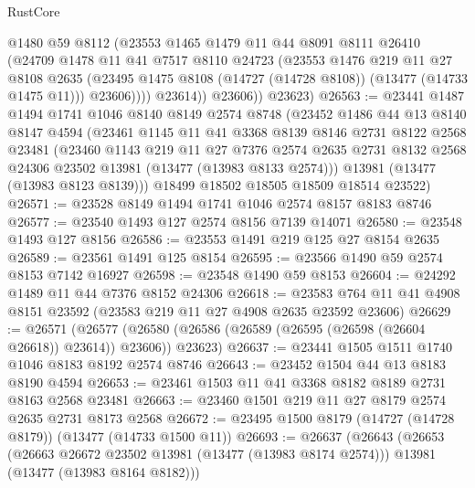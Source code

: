 \begin{lexlean}{RustCore}
\begin{coremodule}
                @1480
                @59
                @8112
                (@23553
                  @1465
                  @1479
                  @11
                  @44
                  @8091
                  @8111
                  @26410
                  (@24709
                    @1478
                    @11
                    @41
                    @7517
                    @8110
                    @24723
                    (@23553
                      @1476
                      @219
                      @11
                      @27
                      @8108
                      @2635
                      (@23495 @1475 @8108 (@14727 (@14728 @8108)) (@13477 (@14733 @1475 @11)))
                      @23606))))
              @23614))
          @23606))
      @23623)
@26563 := @23441
    @1487
    @1494
    @1741
    @1046
    @8140
    @8149
    @2574
    @8748
    (@23452
      @1486
      @44
      @13
      @8140
      @8147
      @4594
      (@23461
        @1145
        @11
        @41
        @3368
        @8139
        @8146
        @2731
        @8122
        @2568
        @23481
        (@23460
          @1143
          @219
          @11
          @27
          @7376
          @2574
          @2635
          @2731
          @8132
          @2568
          @24306
          @23502
          @13981
          (@13477 (@13983 @8133 @2574)))
        @13981
        (@13477 (@13983 @8123 @8139)))
      @18499
      @18502
      @18505
      @18509
      @18514
      @23522)
@26571 := @23528 @8149 @1494 @1741 @1046 @2574 @8157 @8183 @8746
@26577 := @23540 @1493 @127 @2574 @8156 @7139 @14071
@26580 := @23548 @1493 @127 @8156
@26586 := @23553 @1491 @219 @125 @27 @8154 @2635
@26589 := @23561 @1491 @125 @8154
@26595 := @23566 @1490 @59 @2574 @8153 @7142 @16927
@26598 := @23548 @1490 @59 @8153
@26604 := @24292 @1489 @11 @44 @7376 @8152 @24306
@26618 := @23583 @764 @11 @41 @4908 @8151 @23592 (@23583 @219 @11 @27 @4908 @2635 @23592 @23606)
@26629 := @26571
    (@26577 (@26580 (@26586 (@26589 (@26595 (@26598 (@26604 @26618)) @23614)) @23606)) @23623)
@26637 := @23441 @1505 @1511 @1740 @1046 @8183 @8192 @2574 @8746
@26643 := @23452 @1504 @44 @13 @8183 @8190 @4594
@26653 := @23461 @1503 @11 @41 @3368 @8182 @8189 @2731 @8163 @2568 @23481
@26663 := @23460 @1501 @219 @11 @27 @8179 @2574 @2635 @2731 @8173 @2568
@26672 := @23495 @1500 @8179 (@14727 (@14728 @8179)) (@13477 (@14733 @1500 @11))
@26693 := @26637
    (@26643
      (@26653
        (@26663 @26672 @23502 @13981 (@13477 (@13983 @8174 @2574)))
        @13981
        (@13477 (@13983 @8164 @8182)))

\end{coremodule}
\end{lexlean}
